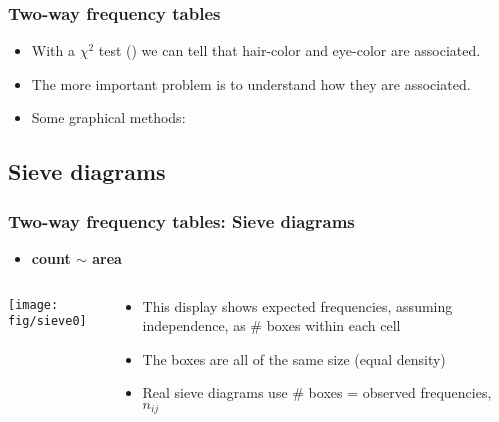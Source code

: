 \renewcommand{\FileName}{twoway}
\begin{frame}
  \frametitle{Two-way frequency tables}


\begin{itemize}
 \item With a $\chi^2$ test () we can tell that hair-color and eye-color are associated.
 \item The more important problem is to understand \alert{how} they are associated.
 \item Some graphical methods:
\end{itemize}
\end{frame}

\subsection{Sieve diagrams}
\begin{frame}
  \frametitle{Two-way frequency tables: Sieve diagrams}
  \begin{itemize}
	\item{\large\bfseries count $\sim$ area}
  \end{itemize}
 \begin{columns}
   \begin{column}{.5\textwidth}
	  \texttt{[image: fig/sieve0]}
   \end{column}
   \begin{column}{.5\textwidth}
      \begin{itemize}
       \item This display shows \alert{expected frequencies}, assuming independence, as \# boxes within each cell
       \item The boxes are all of the same size (equal density)
       \item Real sieve diagrams use \# boxes = \alert{observed frequencies}, $n_{ij}$
      \end{itemize}

	
   \end{column}
 \end{columns}

\end{frame}

